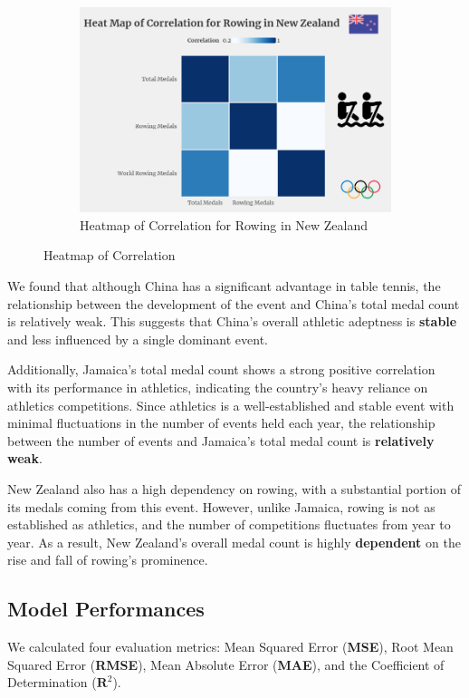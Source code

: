 \documentclass[12pt]{article}  %
\begin{document}
\begin{figure}[H]
\begin{subfigure}[b]{.32\textwidth}
		\includegraphics[width=\textwidth]{img/New Zealand.png}
		\caption{Heatmap of Correlation for Rowing in New Zealand}\label{subfig:3}
	\end{subfigure}
	\caption{Heatmap of Correlation}\label{fig:subfigures}
\end{figure}

We found that although China has a significant advantage in table tennis, the relationship between the development of the event and China's total medal count is relatively weak. This suggests that China's overall athletic adeptness is \textbf{stable} and less influenced by a single dominant event.

Additionally, Jamaica's total medal count shows a strong positive correlation with its performance in athletics, indicating the country's heavy reliance on athletics competitions. Since athletics is a well-established and stable event with minimal fluctuations in the number of events held each year, the relationship between the number of events and Jamaica's total medal count is \textbf{relatively weak}. 

New Zealand also has a high dependency on rowing, with a substantial portion of its medals coming from this event. However, unlike Jamaica, rowing is not as established as athletics, and the number of competitions fluctuates from year to year. As a result, New Zealand's overall medal count is highly \textbf{dependent} on the rise and fall of rowing's prominence.
\subsection{Model Performances}

We calculated four evaluation metrics: Mean Squared Error (\textbf{MSE}), Root Mean Squared Error (\textbf{RMSE}), Mean Absolute Error (\textbf{MAE}), and the Coefficient of Determination (\(\mathbf{R}^2\)).
\end{document}
